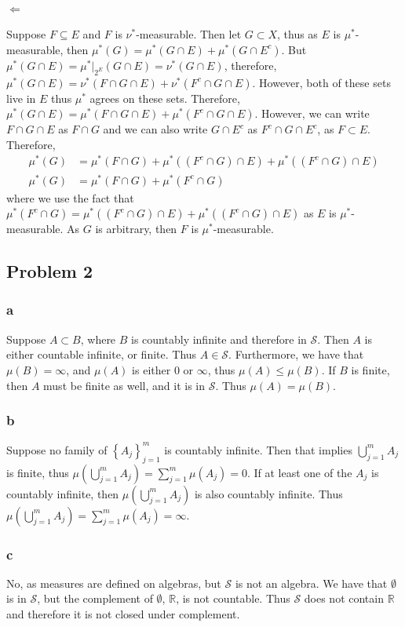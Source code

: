 \documentclass{article}
\theoremstyle{definition}
\numberwithin{theorem}{section}
\numberwithin{equation}{section}
\newcommand{\sig}{\mathcal{S}}
\begin{document}
\paragraph{$\Leftarrow$} 
Suppose $F \subseteq E$ and $F$ is $\nu^*$-measurable. Then let $G \subset X$, thus as $E$ is $\mu^*$-measurable, then $\mu^*(G) = \mu^*(G \cap E) + \mu^*(G \cap E^c)$. But $\mu^*(G \cap E) = \mu^*|_{2^E}(G \cap E) = \nu^*(G \cap E)$, therefore, $\mu^*(G \cap E) = \nu^*(F \cap G \cap E) + \nu^*(F^c \cap G \cap E)$. However, both of these sets live in $E$ thus $\mu^*$ agrees on these sets. Therefore, $\mu^*(G \cap E) = \mu^*(F \cap G \cap E) + \mu^*(F^c \cap G \cap E)$. However, we can write $F \cap G \cap E$ as $F \cap G$ and we can also write $G \cap E^c$ as $F^c \cap G \cap E^c$, as $F \subset E$. Therefore, 
\begin{align*}
	\mu^*(G) &= \mu^*(F \cap G) + \mu^*((F^c \cap G) \cap E) + \mu^*((F^c \cap G) \cap E)\\
	\mu^*(G) &= \mu^*(F \cap G) + \mu^*(F^c \cap G)
\end{align*}
where we use the fact that $\mu^*(F^c \cap G) = \mu^*((F^c \cap G) \cap E) + \mu^*((F^c \cap G) \cap E)$ as $E$ is $\mu^*$-measurable. As $G$ is arbitrary, then $F$ is $\mu^*$-measurable. 
\subsection{Problem 2}
\subsubsection{a}
Suppose $A \subset B$, where $B$ is countably infinite and therefore in $\sig$. Then $A$ is either countable infinite, or finite. Thus $A \in \sig$. Furthermore, we have that $\mu(B) = \infty$, and $\mu(A)$ is either $0$ or $\infty$, thus $\mu(A) \leq \mu(B)$. If $B$ is finite, then $A$ must be finite as well, and it is in $\sig$. Thus $\mu(A) = \mu(B)$.
\subsubsection{b}
Suppose no family of $\left\lbrace A_j \right\rbrace_{j = 1}^m$ is countably infinite. Then that implies $\bigcup_{j = 1}^m A_j$ is finite, thus $\mu(\bigcup_{j = 1}^m A_j) = \sum_{j = 1}^m \mu(A_j) = 0$. If at least one of the $A_j$ is countably infinite, then $\mu(\bigcup_{j = 1}^m A_j)$ is also countably infinite. Thus $\mu(\bigcup_{j = 1}^m A_j) = \sum_{j = 1}^m \mu(A_j) = \infty$.
\subsubsection{c}
No, as measures are defined on algebras, but $\sig$ is not an algebra. We have that $\emptyset$ is in $\sig$, but the complement of $\emptyset$, $\mathbb{R}$, is not countable. Thus $\sig$ does not contain $\mathbb{R}$ and therefore it is not closed under complement.
\end{document}
